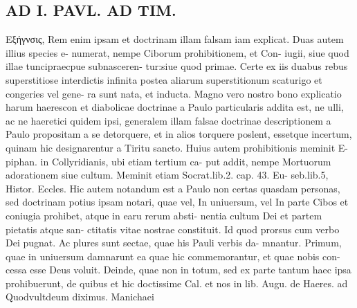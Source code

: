 \documentclass{article}
\begin{document}
\begin{pages}
\section*{AD I. PAVL. AD TIM. }
\marginpar{[ p.400 ]}Εξήγνσις, Rem enim ipsam et doctrinam illam falsam iam explicat. Duas autem illius species e- numerat, nempe Ciborum prohibitionem, et Con- iugii, siue quod illae tuncipraecpue subnasceren- tur:siue quod primae. Certe ex iis duabus rebus superstitiose interdictis infinita postea aliarum superstitionum scaturigo et congeries vel gene- ra sunt nata, et inducta. Magno vero nostro bono explicatio harum haerescon et diabolicae doctrinae a Paulo particularis addita est, ne ulli, ac ne haeretici quidem ipsi, generalem illam falsae doctrinae descriptionem a Paulo propositam a se detorquere, et in alios torquere poslent, essetque incertum, quinam hic designarentur a Tiritu sancto. Huius autem prohibitionis meminit E- piphan. in Collyridianis, ubi etiam tertium ca- put addit, nempe Mortuorum adorationem siue cultum. Meminit etiam Socrat.lib.2. cap. 43. Eu- seb.lib.5, Histor. Eccles. Hic autem notandum est a Paulo non certas quasdam personas, sed doctrinam potius ipsam notari, quae vel, In uniuersum, vel In parte Cibos et coniugia prohibet, atque in earu rerum absti- nentia cultum Dei et partem pietatis atque san- ctitatis vitae nostrae constituit. Id quod prorsus cum verbo Dei pugnat. Ac plures sunt sectae, quae his Pauli verbis da- mnantur. Primum, quae in uniuersum damnarunt ea quae hic commemorantur, et quae nobis con- cessa esse Deus voluit. Deinde, quae non in totum, sed ex parte tantum haec ipsa prohibuerunt, de quibus et hic doctissime Cal. et nos in lib. Augu. de Haeres. ad Quodvultdeum diximus. Manichaei 

\end{pages}
\end{document}

